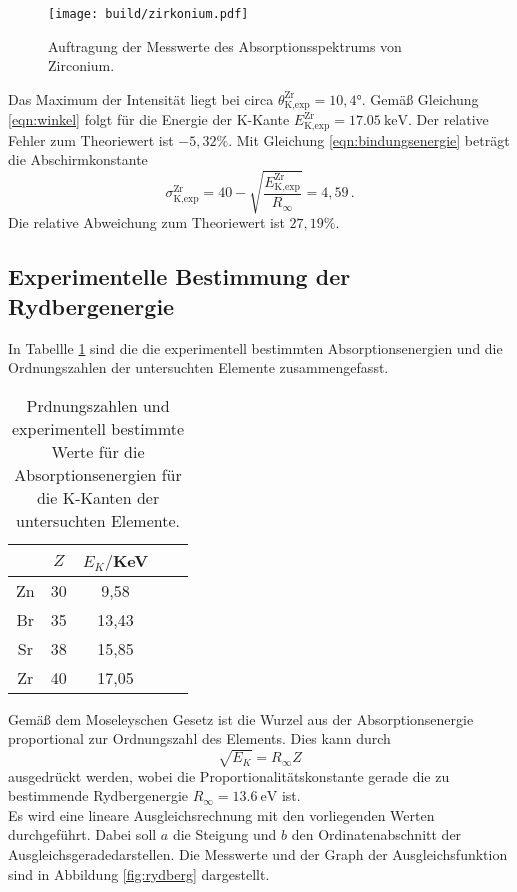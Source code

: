 \begin{figure}
  \centering
  \texttt{[image: build/zirkonium.pdf]}
  \caption{Auftragung der Messwerte des Absorptionsspektrums von Zirconium.}
  \label{fig:zirconium}
\end{figure}

Das Maximum der Intensität liegt bei circa $\theta_{\text{K,exp}}^{\text{Zr}} = 10{,}4°$.
Gemäß Gleichung \eqref{eqn:winkel} folgt für die Energie der K-Kante $E_{\text{K,exp}}^{\text{Zr}} = \SI{17.05}{\kilo\electronvolt}$.
Der relative Fehler zum Theoriewert ist $-5{,}32\%$. Mit Gleichung \eqref{eqn:bindungsenergie}
beträgt die Abschirmkonstante
\begin{equation*}
  \sigma_{\text{K,exp}}^{\text{Zr}} =  40 - \sqrt{\frac{E_{\text{K,exp}}^{\text{Zr}}}{R_\infty}} = 4{,}59\,.
\end{equation*}
Die relative Abweichung zum Theoriewert ist $27{,}19\%$.

\subsection{Experimentelle Bestimmung der Rydbergenergie}

In Tabellle \ref{tab:zusammenfassung} sind die die experimentell bestimmten Absorptionsenergien
und die Ordnungszahlen der untersuchten Elemente zusammengefasst.

\begin{table}
	\begin{center}
    \caption{Prdnungszahlen und experimentell bestimmte Werte für die Absorptionsenergien
    für die K-Kanten der untersuchten Elemente.}
    \label{tab:zusammenfassung}
		\begin{tabular}{ccccc}
		\toprule
			& {$Z$} & {$E_K/$KeV} \\
			\midrule
			Zn &  30  & 9,58  \\
      Br &  35  & 13,43 \\
      Sr &  38  & 15,85 \\
      Zr &  40  & 17,05 \\
		\bottomrule
		\end{tabular}
	\end{center}
\end{table}

Gemäß dem Moseleyschen Gesetz ist die Wurzel aus der Absorptionsenergie proportional
zur Ordnungszahl des Elements. Dies kann durch
\begin{equation*}
  \sqrt{E_K} = R_\infty Z
\end{equation*}
ausgedrückt werden, wobei die Proportionalitätskonstante gerade die zu bestimmende
Rydbergenergie $R_\infty = \SI{13.6}{\electronvolt}$ ist.\\
Es wird eine lineare Ausgleichsrechnung mit den vorliegenden Werten durchgeführt.
Dabei soll $a$ die Steigung und $b$ den Ordinatenabschnitt der Ausgleichsgeradedarstellen.  Die Messwerte
und der Graph der Ausgleichsfunktion sind in Abbildung \ref{fig:rydberg} dargestellt.

